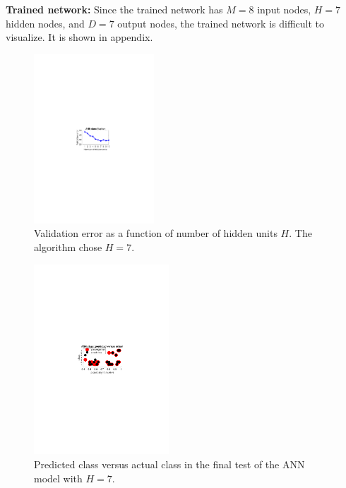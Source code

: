 \textbf{Trained network:} Since the trained network has $M = 8$ input nodes, $H=7$ hidden nodes,  and $D=7$ output nodes, the trained network is difficult to visualize. It is shown in appendix. 

\begin{multicols}{2}
\newpage
\begin{figure}[H]
\centering
    \includegraphics[width=0.40\textwidth]{fig/classification/ANN_class_validation_error.pdf}
    \caption{Validation error as a function of number of hidden units $H$. The algorithm chose $H=7$.}
    \label{fig:ANN_class_validation_error}
\end{figure}


\begin{figure}[H]
\centering
    \includegraphics[width=0.45\textwidth]{fig/classification/ANN_class_predicted_vs_actual.pdf}
    \caption{Predicted class versus actual class in the final test of the ANN model with $H=7$.}
    \label{fig:ANN_class_predicted_vs_actual}
\end{figure}
\end{multicols}

